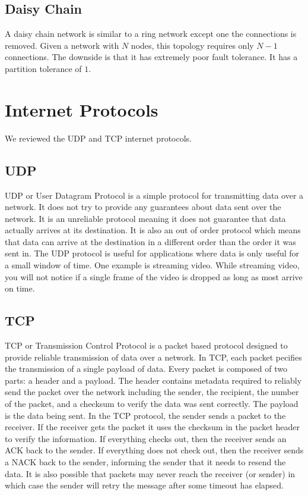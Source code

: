 ﻿\documentclass[twoside]{article}
\begin{document}
\subsection{Daisy Chain}
A daisy chain network is similar to a ring network except one
the connections is removed. Given a network with $N$ nodes, this
topology requires only $N-1$ connections. The downside is that
it has extremely poor fault tolerance. It has a partition
tolerance of $1$.

\section{Internet Protocols}

We reviewed the UDP and TCP internet protocols.

\subsection{UDP}

UDP or User Datagram Protocol is a simple protocol for
transmitting data over a network. It does not try to provide any
guarantees about data sent over the network. It is an unreliable
protocol meaning it does not guarantee that data actually arrives
at its destination. It is also an out of order protocol which
means that data can arrive at the destination in a different order
than the order it was sent in. The UDP protocol is useful for
applications where data is only useful for a small window of time. One
example is streaming video. While streaming video, you will not notice
if a single frame of the video is dropped as long as most arrive on time.

\subsection{TCP}

TCP or Transmission Control Protocol is a packet based protocol designed
to provide reliable transmission of data over a network. In TCP, each packet
pecifies the transmission of a single payload of data. Every packet is
composed of two parts: a header and a payload. The header contains
metadata required to reliably send the packet over the network including
the sender, the recipient, the number of the packet, and a checksum to
verify the data was sent correctly. The payload is the data being sent.
In the TCP protocol, the sender sends a packet to the receiver. If the
receiver gets the packet it uses the checksum in the packet header to
verify the information. If everything checks out, then the receiver
sends an ACK back to the sender. If everything does not check
out, then the receiver sends a NACK back to the sender, informing
the sender that it needs to resend the data. It is also possible that
packets may never reach the receiver (or sender) in which case the sender
will retry the message after some timeout has elapsed.
\end{document}
